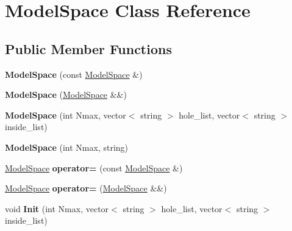 \hypertarget{classModelSpace}{\section{Model\-Space Class Reference}
\label{classModelSpace}
}
\subsection*{Public Member Functions}
\begin{DoxyCompactItemize}
\item 
\hypertarget{classModelSpace_a9554b9bc74b82e392fafc9de496fce5f}{{\bfseries Model\-Space} (const \hyperlink{classModelSpace}{Model\-Space} \&)}\label{classModelSpace_a9554b9bc74b82e392fafc9de496fce5f}

\item 
\hypertarget{classModelSpace_a6fe287e59b9aca7719a553f7dedcd2d7}{{\bfseries Model\-Space} (\hyperlink{classModelSpace}{Model\-Space} \&\&)}\label{classModelSpace_a6fe287e59b9aca7719a553f7dedcd2d7}

\item 
\hypertarget{classModelSpace_a1d93cd1705e0f5dd3421e7617dbbc16e}{{\bfseries Model\-Space} (int Nmax, vector$<$ string $>$ hole\-\_\-list, vector$<$ string $>$ inside\-\_\-list)}\label{classModelSpace_a1d93cd1705e0f5dd3421e7617dbbc16e}

\item 
\hypertarget{classModelSpace_a75259e2dbe635145cb2f3973866e941f}{{\bfseries Model\-Space} (int Nmax, string)}\label{classModelSpace_a75259e2dbe635145cb2f3973866e941f}

\item 
\hypertarget{classModelSpace_a2b01062b499979b919b7b77b04745cbe}{\hyperlink{classModelSpace}{Model\-Space} {\bfseries operator=} (const \hyperlink{classModelSpace}{Model\-Space} \&)}\label{classModelSpace_a2b01062b499979b919b7b77b04745cbe}

\item 
\hypertarget{classModelSpace_ab1d44cc22730d233506daa4f6e83187c}{\hyperlink{classModelSpace}{Model\-Space} {\bfseries operator=} (\hyperlink{classModelSpace}{Model\-Space} \&\&)}\label{classModelSpace_ab1d44cc22730d233506daa4f6e83187c}

\item 
\hypertarget{classModelSpace_a723f9a5ffb93d5d918ad46500d6136df}{void {\bfseries Init} (int Nmax, vector$<$ string $>$ hole\-\_\-list, vector$<$ string $>$ inside\-\_\-list)}\label{classModelSpace_a723f9a5ffb93d5d918ad46500d6136df}


\end{DoxyCompactItemize}
